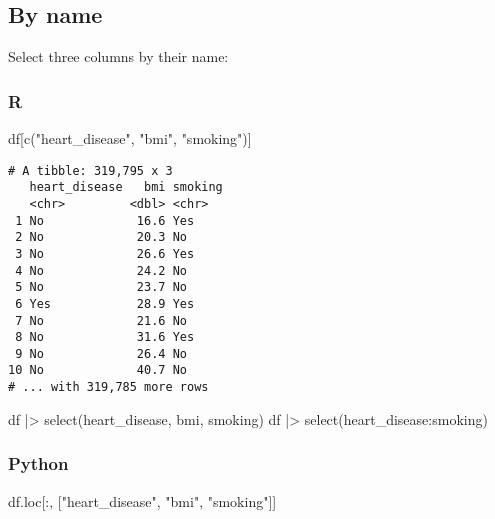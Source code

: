\documentclass[
  letterpaper,
  DIV=11,
  numbers=noendperiod]{scrreprt}
\newenvironment{Shaded}{\begin{snugshade}}{\end{snugshade}}
\newcommand{\FunctionTok}[1]{\textcolor[rgb]{0.28,0.35,0.67}{#1}}
\newcommand{\NormalTok}[1]{\textcolor[rgb]{0.00,0.46,0.62}{#1}}
\newcommand{\SpecialCharTok}[1]{\textcolor[rgb]{0.37,0.37,0.37}{#1}}
\newcommand{\StringTok}[1]{\textcolor[rgb]{0.13,0.47,0.30}{#1}}
\begin{document}
\hypertarget{by-name}{%
\subsection{By name}\label{by-name}}

Select three columns by their name:

\hypertarget{r-18}{%
\subsubsection{R}\label{r-18}}

\begin{Shaded}
\begin{Highlighting}[]
\NormalTok{df[}\FunctionTok{c}\NormalTok{(}\StringTok{"heart\_disease"}\NormalTok{, }\StringTok{"bmi"}\NormalTok{, }\StringTok{"smoking"}\NormalTok{)]}
\end{Highlighting}
\end{Shaded}

\begin{verbatim}
# A tibble: 319,795 x 3
   heart_disease   bmi smoking
   <chr>         <dbl> <chr>  
 1 No             16.6 Yes    
 2 No             20.3 No     
 3 No             26.6 Yes    
 4 No             24.2 No     
 5 No             23.7 No     
 6 Yes            28.9 Yes    
 7 No             21.6 No     
 8 No             31.6 Yes    
 9 No             26.4 No     
10 No             40.7 No     
# ... with 319,785 more rows
\end{verbatim}

\begin{Shaded}
\begin{Highlighting}[]
\NormalTok{df }\SpecialCharTok{|\textgreater{}} \FunctionTok{select}\NormalTok{(heart\_disease, bmi, smoking)}
\NormalTok{df }\SpecialCharTok{|\textgreater{}} \FunctionTok{select}\NormalTok{(heart\_disease}\SpecialCharTok{:}\NormalTok{smoking)}
\end{Highlighting}
\end{Shaded}

\hypertarget{python-18}{%
\subsubsection{Python}\label{python-18}}

\begin{Shaded}
\begin{Highlighting}[]
\NormalTok{df.loc[:, [}\StringTok{"heart\_disease"}\NormalTok{, }\StringTok{"bmi"}\NormalTok{, }\StringTok{"smoking"}\NormalTok{]]}
\end{Highlighting}
\end{Shaded}
\end{document}
